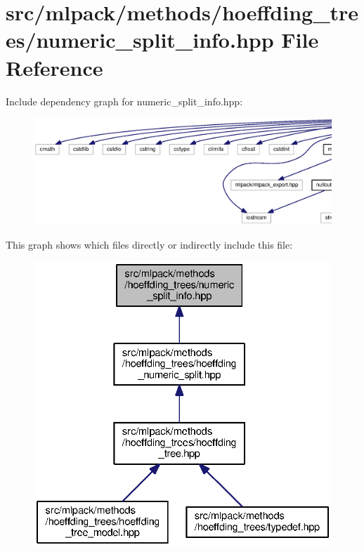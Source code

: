 \section{src/mlpack/methods/hoeffding\+\_\+trees/numeric\+\_\+split\+\_\+info.hpp File Reference}
\label{numeric__split__info_8hpp}
Include dependency graph for numeric\+\_\+split\+\_\+info.\+hpp\+:
\nopagebreak
\begin{figure}[H]
\begin{center}
\leavevmode
\includegraphics[width=350pt]{numeric__split__info_8hpp__incl}
\end{center}
\end{figure}
This graph shows which files directly or indirectly include this file\+:
\nopagebreak
\begin{figure}[H]
\begin{center}
\leavevmode
\includegraphics[width=332pt]{numeric__split__info_8hpp__dep__incl}
\end{center}
\end{figure}
